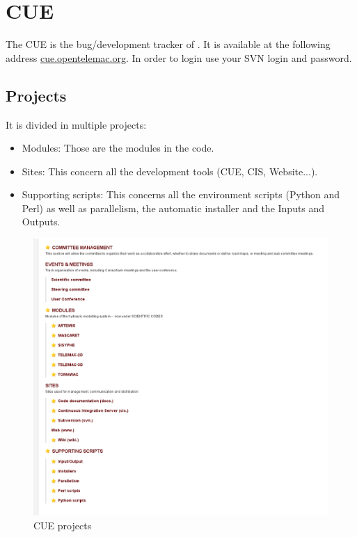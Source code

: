 %
\chapter{CUE}
%
The CUE is the bug/development tracker of \telemacsystem.
It is available at the following address \url{cue.opentelemac.org}.
In order to login use your SVN login and password.
%
%
\section{Projects}
%
%
\label{proj}
It is divided in multiple projects:
\begin{itemize}
\item Modules: Those are the modules in the \telemacsystem code.
\item Sites: This concern all the development tools (CUE, CIS, Website...).
\item Supporting scripts: This concerns all the environment scripts (Python and
Perl) as well as parallelism, the automatic installer and the Inputs and
Outputs.
\end{itemize}
\begin{figure}[H]
    \centering
    \includegraphics[scale=0.35]{graphics/cue-projects.png}
    \caption{CUE projects}
    \label{fig:cue-projects}
\end{figure}
%
%
